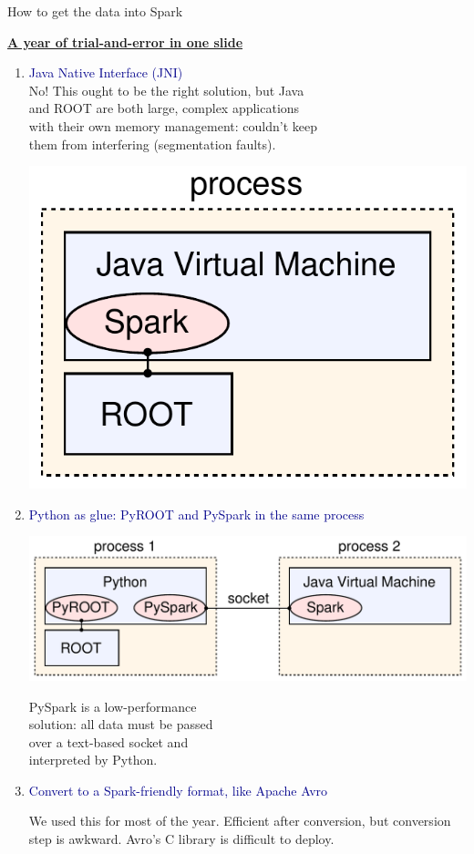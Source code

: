 \documentclass[aspectratio=169]{beamer}
\begin{document}
\begin{frame}{How to get the data into Spark}
\vspace{0.5 cm}
\small

\underline{\large \bf A year of trial-and-error in one slide}
\begin{center}
\begin{minipage}{0.8\linewidth}
\begin{enumerate}
\item \textcolor{darkblue}{Java Native Interface (JNI)} \\ No! This ought to be the right solution, but Java \\ and ROOT are both large, complex applications \\ with their own memory management: couldn't keep \\ them from interfering (segmentation faults).

\vspace{-2.2 cm}
\hfill \includegraphics[height=1.65 cm]{root-spark.pdf}

\vspace{0.5 cm}
\item \textcolor{darkblue}{\normalsize Python as glue: PyROOT and PySpark in the same process}

\hfill \includegraphics[height=1.65 cm]{pyroot-pyspark.pdf}

\vspace{-1.8 cm}
PySpark is a low-performance \\ solution: all data must be passed \\ over a text-based socket and \\ interpreted by Python.

\item \textcolor{darkblue}{\normalsize Convert to a Spark-friendly format, like Apache Avro}

We used this for most of the year. Efficient after conversion, but conversion step is awkward. Avro's C library is difficult to deploy.
\end{enumerate}
\end{minipage}
\end{center}


\end{frame}
\end{document}
